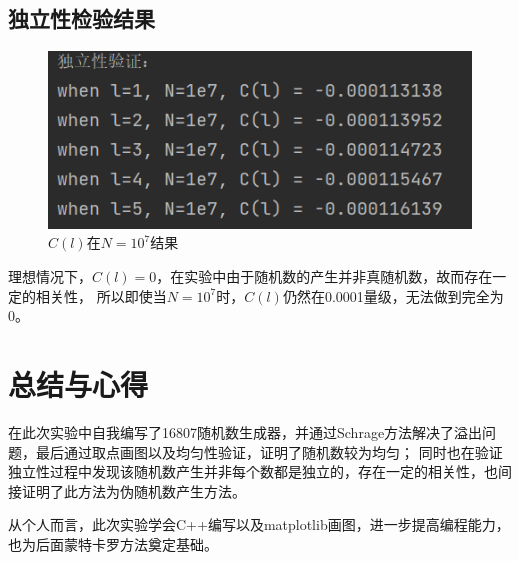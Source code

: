 \documentclass{article}
\begin{document}
                    \subsection{独立性检验结果}
                    \begin{figure}[H]
                        \centering
                        \includegraphics[width= .6\textwidth]{picture/22222.png}
                        \caption{$C(l)$在$N=10^7$结果}
                    \end{figure}
                        理想情况下，$C(l)=0$，在实验中由于随机数的产生并非真随机数，故而存在一定的相关性，
                        所以即使当$N=10^7$时，$C(l)$仍然在0.0001量级，无法做到完全为0。
                    
            \section{总结与心得}
                        在此次实验中自我编写了16807随机数生成器，并通过Schrage方法解决了溢出问题，最后通过取点画图以及均匀性验证，证明了随机数较为均匀；
                        同时也在验证独立性过程中发现该随机数产生并非每个数都是独立的，存在一定的相关性，也间接证明了此方法为伪随机数产生方法。

                        从个人而言，此次实验学会C++编写以及matplotlib画图，进一步提高编程能力，也为后面蒙特卡罗方法奠定基础。
                       
                    
\end{document}
